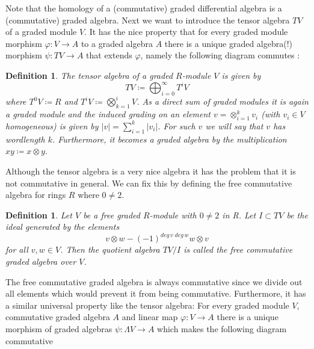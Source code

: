 \documentclass[12pt,a4paper]{scrartcl}
\newtheorem{Definition}[Theorem]{Definition}
\numberwithin{equation}{section}
\begin{document}
Note that the homology of a (commutative) graded differential algebra is a (commutative) graded algebra. \newline
Next we want to introduce the tensor algebra $TV$ of a graded module $V$. It has the nice property
that for every graded module morphism $\varphi \colon V \to A$ to a graded algebra $A$ there is a unique 
graded algebra(!) morphism $\psi \colon TV \to A$ that extends $\varphi$, namely the following diagram commutes :

\centerline{ 
}

\begin{Definition}
 The \emph{tensor algebra} of a graded $R$-module $V$ is given by
 $$ TV \coloneqq \bigoplus_{i = 0}^\infty T^i V$$
 where $T^0 V \coloneqq R$ and $T^i V \coloneqq \bigotimes_{k=1}^i V$. \newline
 As a direct sum of graded modules it is again a graded module and the induced grading on an element
 $ v = \otimes_{i = 1}^k v_i $ (with $v_i \in V$ homogeneous) is given by $ |v| = \sum_{ i = 1}^k |v_i|$.
 For such $v$ we will say that $v$ has \emph{wordlength} $k$.
 Furthermore, it becomes a graded algebra by the multiplication $xy \coloneqq x \otimes y$.
\end{Definition}

Although the tensor algebra is a very nice algebra it has the problem that it is not commutative in general. We can fix this by
defining the free commutative algebra for rings $R$ where $0 \neq 2$.

\begin{Definition}
 Let $V$ be a free graded $R$-module with $0 \neq 2$ in R. Let $I \subset TV$ be the ideal generated by the elements
 $$ v \otimes w - (-1)^{deg \, v \; deg \, w} w \otimes v$$
 for all $v,w \in V$. Then the quotient algebra $TV/I$ is called the \emph{free commutative graded algebra} over $V$.
\end{Definition}

The free commutative graded algebra is always commutative since we divide out all elements which would prevent it 
from being commutative. Furthermore, it has a similar universal property like the tensor algebra: For every graded
module $V$, commutative graded algebra $A$ and linear map $\varphi \colon V \to A$ there is a unique morphism of
graded algebras $\psi \colon \Lambda V \to A$ which makes the following diagram commutative
\end{document}
